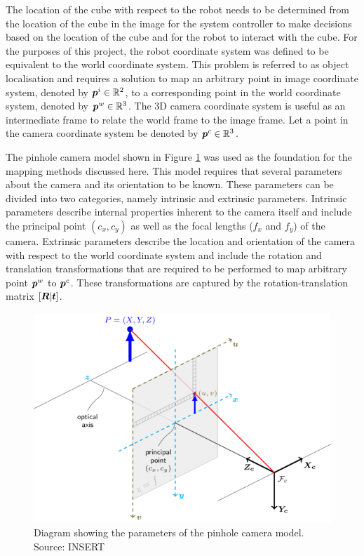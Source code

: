 The location of the cube with respect to the robot needs to be determined from the location of the cube in the image for the system controller to make decisions based on the location of the cube and for the robot to interact with the cube. For the purposes of this project, the robot coordinate system was defined to be equivalent to the world coordinate system. This problem is referred to as object localisation and requires a solution to map an arbitrary point in image coordinate system, denoted by $\bm{p}^i\in\mathbb{R}^2$, to a corresponding point in the world coordinate system, denoted by $\bm{p}^w\in\mathbb{R}^3$. The 3D camera coordinate system is useful as an intermediate frame to relate the world frame to the image frame. Let a point in the camera coordinate system be denoted by $\bm{p}^c\in\mathbb{R}^3$.


The pinhole camera model shown in Figure \ref{fig:pinhole-camera-model} was used as the foundation for the mapping methods discussed here. This model requires that several parameters about the camera and its orientation to be known. These parameters can be divided into two categories, namely intrinsic and extrinsic parameters. Intrinsic parameters describe internal properties inherent to the camera itself and include the principal point $(c_x,c_y)$ as well as the focal lengths ($f_x$ and $f_y$) of the camera. Extrinsic parameters describe the location and orientation of the camera with respect to the world coordinate system and include the rotation and translation transformations that are required to be performed to map arbitrary point $\bm{p}^w$ to $\bm{p}^c$. These transformations are captured by the rotation-translation matrix $[\bm{R}|\bm{t}]$.

\begin{figure}[!ht]
	\centering
	\includegraphics[width=0.7\linewidth]{figures/pinhole-camera-model.png}
	\caption{Diagram showing the parameters of the pinhole camera model. Source: INSERT}
	\label{fig:pinhole-camera-model}
\end{figure}

